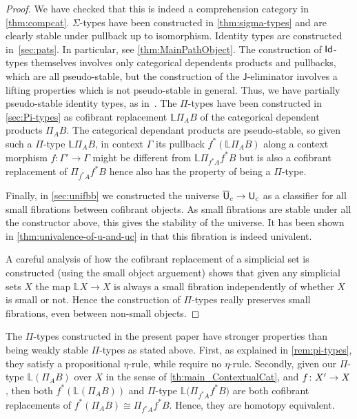 \documentclass[reqno,10pt,a4paper,oneside,draft]{amsart}
\begin{document}
\begin{proof}
We have checked that this is indeed a comprehension category in \cref{thm:compcat}. $\Sigma$-types have been constructed in \cref{thm:sigma-types} and are clearly stable under pullback up to isomorphism. Identity types are constructed in~\cref{sec:pats}. In particular, see \cref{thm:MainPathObject}. The construction of $\mathsf{Id}$-types themselves involves only categorical dependents products and pullbacks, which are all pseudo-stable, but the construction of the $\mathsf{J}$-eliminator involves a lifting properties which is not pseudo-stable 
in general. Thus, we have partially pseudo-stable identity types, as in~\cite[Definition 2.3.4]{LumsdaineP:locuoc}.
The $\Pi$-types have been constructed in \cref{sec:Pi-types} as cofibrant replacement $\mathbb{L} \Pi_A B$ of the categorical dependent products $\Pi_A B$. The categorical dependant products are pseudo-stable, so given such a $\Pi$-type $\mathbb{L} \Pi_A B$, in context $\Gamma$ its pullback $f^*( \mathbb{L} \Pi_A B)$ along a context morphism $f:\Gamma' \rightarrow \Gamma$ might be different from $\mathbb{L} \Pi_{f^* A} f^* B$ but is also a cofibrant replacement of $\Pi_{f^* A} f^* B$ hence also has the property of being a $\Pi$-type.

Finally, in \cref{sec:unifbb} we constructed the universe $\overline{\mathsf{U}}_c \rightarrow \mathsf{U}_c$ as a classifier for all small fibrations between cofibrant objects. As small fibrations are stable under all the constructor above, this gives the stability of the universe. It has been shown in \cref{thm:univalence-of-u-and-uc} in that this fibration is indeed univalent.

A careful analysis of how the cofibrant replacement of a simplicial set is constructed (using the small object arguement) shows that given any simplicial sets $X$ the map $\mathbb{L} X \rightarrow X$ is always a small fibration independently of whether $X$ is small or not. Hence the construction of $\Pi$-types really preserves small fibrations, even between non-small objects.
\end{proof}







\begin{remark}
The $\Pi$-types constructed in the present paper have stronger properties than being weakly stable $\Pi$-types as stated above. First, as explained in \cref{rem:pi-types}, they satisfy a propositional $\eta$-rule, while \cite{LumsdaineP:locuoc} require no $\eta$-rule. Secondly, given our $\Pi$-type $\mathbb{L}(\Pi_A B)$ over $X$ in the sense of \cref{th:main_ContextualCat}, and $f \colon X'  \rightarrow X$, then  both $f^*( \mathbb{L} ( \Pi_A B ))$ and $\Pi$-type $\mathbb{L} \big( \Pi_{f^* A} f^* B \big)$ are both cofibrant replacements of $f^* (\Pi_A B) \cong \Pi_{f^*A} f^* B $. Hence, they are homotopy equivalent. 
\end{remark}
\end{document}
